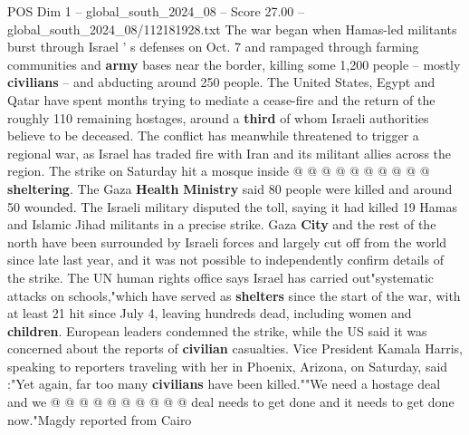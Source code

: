\begin{textsample}{POS Dim 1 – global\_south\_2024\_08 – Score 27.00 – global\_south\_2024\_08/112181928.txt}
The war began when Hamas-led militants burst through Israel ' s defenses on Oct. 7 and rampaged through farming communities and \textbf{army} bases near the border, killing some 1,200 people -- mostly \textbf{civilians} -- and abducting around 250 people.
The United States, Egypt and Qatar have spent months trying to mediate a cease-fire and the return of the roughly 110 remaining hostages, around a \textbf{third} of whom Israeli authorities believe to be deceased.
The conflict has meanwhile threatened to trigger a regional war, as Israel has traded fire with Iran and its militant allies across the region.
The strike on Saturday hit a mosque inside @ @ @ @ @ @ @ @ @ @ \textbf{sheltering}.
The Gaza \textbf{Health} \textbf{Ministry} said 80 people were killed and around 50 wounded.
The Israeli military disputed the toll, saying it had killed 19 Hamas and Islamic Jihad militants in a precise strike.
Gaza \textbf{City} and the rest of the north have been surrounded by Israeli forces and largely cut off from the world since late last year, and it was not possible to independently confirm details of the strike.
The UN human rights office says Israel has carried out"systematic attacks on schools,"which have served as \textbf{shelters} since the start of the war, with at least 21 hit since July 4, leaving hundreds dead, including women and \textbf{children}.
European leaders condemned the strike, while the US said it was concerned about the reports of \textbf{civilian} casualties.
Vice President Kamala Harris, speaking to reporters traveling with her in Phoenix, Arizona, on Saturday, said :"Yet again, far too many \textbf{civilians} have been killed.""We need a hostage deal and we @ @ @ @ @ @ @ @ @ @ deal needs to get done and it needs to get done now."Magdy reported from Cairo

\end{textsample}
